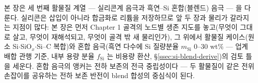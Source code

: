 본 장은 세 번째 활물질 계열 --- 실리콘계 음극과 흑연--Si 혼합(블렌드) 음극 --- 을 다룬다. 실리콘은
삽입이 아니라 합금화로 리튬을 저장하므로 앞 두 장과 물리가 갈라지는 지점이 많다: 본 장은 먼저
Chapter 1 골격의 노드별 생존 지도를 놓고(무엇이 그대로 살고, 무엇이 재해석되고, 무엇이 골격 밖 새
물리인가), 그 위에서 활물질 케이스(원소 Si$\cdot$SiO$_x$$\cdot$Si--C 복합)와 혼합 음극(흑연 다수에
Si 질량분율 $m_\mathrm{Si}$ 0--30 wt\% --- 업계 배합 관행 기준, 내부 용량 분율 $f_\mathrm{Si}$ 는 비용량 환산, \S\ref{ssec:si-blend-derive})의 검토 틀을 세운다. 혼합 음극의 앵커는 전하 보존의 전극
중립성이다 --- 두 활물질이 같은 전위 손잡이를 공유하는 전하 보존 반전이 blend 합성의 중심식이 된다.

\tableofcontents
\clearpage
